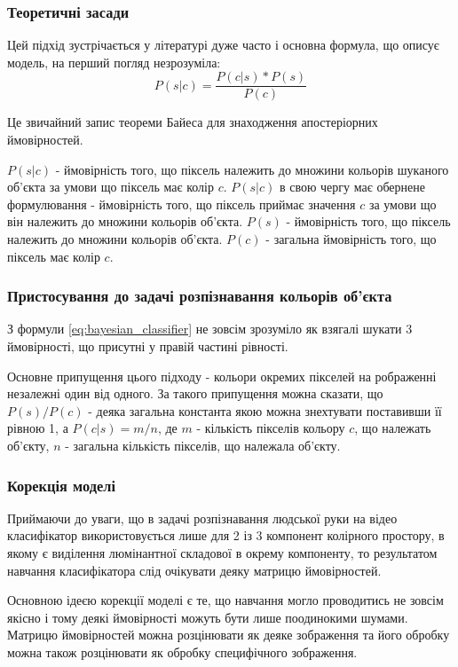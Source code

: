 \subsubsection{Теоретичні засади}

Цей підхід зустрічається у літературі дуже часто і основна формула, що описує модель, на перший погляд незрозуміла:
\begin{equation}
\label{eq:bayesian_classifier}
P(s|c) = \frac{P(c|s) * P(s)}{P(c)}
\end{equation}

Це звичайний запис теореми Байеса для знаходження апостеріорних ймовірностей.

$P(s|c)$ - ймовірність того, що піксель належить до множини кольорів шуканого об'єкта за умови що піксель має колір $c$. $P(s|c)$ в свою чергу має обернене формулювання - ймовірність того, що піксель приймає значення $c$ за умови що він належить до множини кольорів об'єкта.
$P(s)$ - ймовірність того, що піксель належить до множини кольорів об'єкта. $P(c)$ - загальна ймовірність того, що піксель має колір $c$.

\subsubsection{Пристосування до задачі розпізнавання кольорів об'єкта}

З формули \ref{eq:bayesian_classifier} не зовсім зрозуміло як взягалі шукати 3 ймовірності, що присутні у правій частині рівності.

Основне припущення цього підходу - кольори окремих пікселей на рображенні незалежні один від одного. За такого припущення можна сказати, що $P(s)/P(c)$ - деяка загальна константа якою можна знехтувати поставивши її рівною 1, а $P(c|s) = m/n$, де $m$ - кількість пікселів кольору $c$, що належать об'єкту, $n$ - загальна кількість пікселів, що належала об'єкту.

\subsubsection{Корекція моделі}
Приймаючи до уваги, що в задачі розпізнавання людської руки на відео класифікатор використовується лише для 2 із 3 компонент колірного простору, в якому є виділення люмінантної складової в окрему компоненту, то результатом навчання класифікатора слід очікувати деяку матрицю ймовірностей.

Основною ідеєю корекції моделі є те, що навчання могло проводитись не зовсім якісно і тому деякі ймовірності можуть бути лише поодинокими шумами. Матрицю ймовірностей можна розцінювати як деяке зображення та його обробку можна також розцінювати як обробку специфічного зображення.

